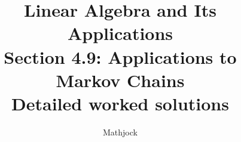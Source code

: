
\title{\textbf{Linear Algebra and Its Applications}\\[0.3em]Section 4.9: Applications to Markov Chains\\[0.3em]\large Detailed worked solutions}
\author{Mathjock}
\date{}

\maketitle
\bookinfo
\tableofcontents
\clearpage
\renewcommand{\thesection}{4.\arabic{section}}
\renewcommand{\theHsection}{4.\arabic{section}}
\setcounter{section}{8}


